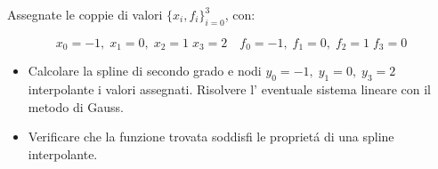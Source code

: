 Assegnate le coppie di valori $\{x_i,f_i \}_{i=0}^3$, con:

\[ x_0=-1, \; x_1=0, \; x_2=1  \; x_3=2 \quad f_0=-1, \; f_1=0, \; f_2=1  \; f_3=0\]

\begin{itemize}
\item Calcolare la spline di secondo grado e nodi
$y_0=-1, \; y_1=0, \; y_3=2$ interpolante i valori assegnati.
Risolvere l' eventuale sistema lineare con il metodo di Gauss.
\item Verificare che la funzione trovata soddisfi le propriet\'a
di una spline interpolante.

\end{itemize}
